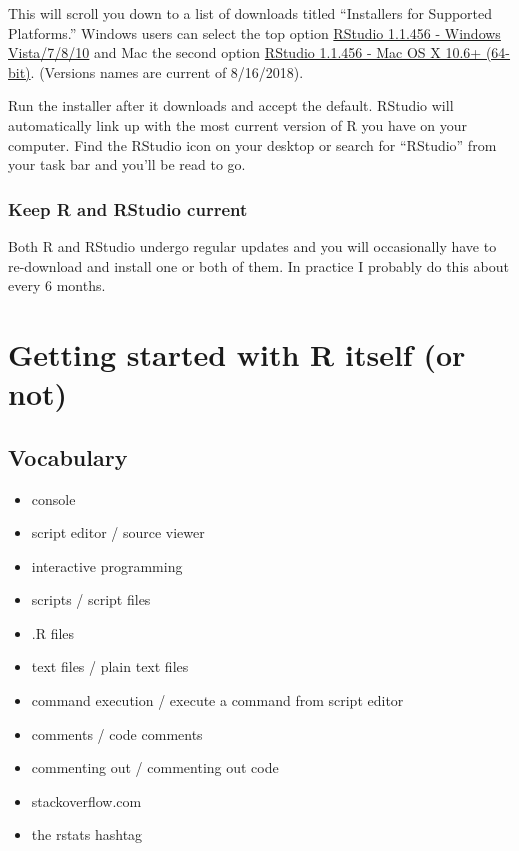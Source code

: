 \documentclass[
]{book}
\providecommand{\tightlist}{%
  \setlength{\itemsep}{0pt}\setlength{\parskip}{0pt}}
\begin{document}
This will scroll you down to a list of downloads titled ``Installers for Supported Platforms.'' Windows users can select the top option \href{https://download1.rstudio.org/RStudio-1.1.456.exe}{RStudio 1.1.456 - Windows Vista/7/8/10} and Mac the second option \href{https://download1.rstudio.org/RStudio-1.1.456.dmg}{RStudio 1.1.456 - Mac OS X 10.6+ (64-bit)}. (Versions names are current of 8/16/2018).

Run the installer after it downloads and accept the default. RStudio will automatically link up with the most current version of R you have on your computer. Find the RStudio icon on your desktop or search for ``RStudio'' from your task bar and you'll be read to go.

\hypertarget{keep-r-and-rstudio-current}{%
\subsection{Keep R and RStudio current}\label{keep-r-and-rstudio-current}}

Both R and RStudio undergo regular updates and you will occasionally have to re-download and install one or both of them. In practice I probably do this about every 6 months.

\hypertarget{getting-started-with-r-itself-or-not}{%
\chapter*{Getting started with R itself (or not)}\label{getting-started-with-r-itself-or-not}}

\hypertarget{vocabulary-1}{%
\section*{Vocabulary}\label{vocabulary-1}}

\begin{itemize}
\tightlist
\item
  console
\item
  script editor / source viewer
\item
  interactive programming
\item
  scripts / script files
\item
  .R files
\item
  text files / plain text files
\item
  command execution / execute a command from script editor
\item
  comments / code comments
\item
  commenting out / commenting out code
\item
  stackoverflow.com
\item
  the rstats hashtag
\end{itemize}
\end{document}
